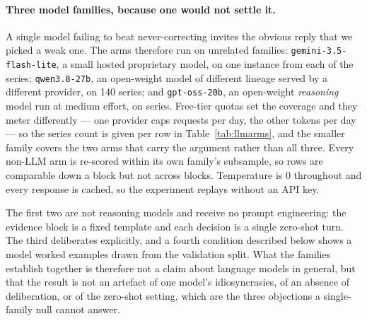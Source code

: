 \paragraph{Three model families, because one would not settle it.}
A single model failing to beat never-correcting invites the obvious reply that we picked
a weak one. The arms therefore run on unrelated families: \texttt{gemini-3.5-flash-lite},
a small hosted proprietary model, on one instance from each of the \nseries{} series;
\texttt{qwen3.8-27b}, an open-weight model of different lineage served by a different
provider, on 140 series; and \texttt{gpt-oss-20b}, an open-weight \emph{reasoning} model
run at medium effort, on \reasonSeries{} series. Free-tier quotas set the coverage and they meter differently ---
one provider caps requests per day, the other tokens per day --- so the series count is
given per row in Table~\ref{tab:llmarms}, and the smaller family covers the two arms that
carry the argument rather than all three. Every non-LLM arm is re-scored within its own
family's subsample, so rows are comparable down a block but not across blocks.
Temperature is 0 throughout and every response is cached, so the experiment replays
without an API key.

The first two are not reasoning models and receive no prompt engineering: the evidence
block is a fixed template and each decision is a single zero-shot turn. The third
deliberates explicitly, and a fourth condition described below shows a model worked
examples drawn from the validation split. What the families establish together is
therefore not a claim about language models in general, but that the result is not an
artefact of one model's idiosyncrasies, of an absence of deliberation, or of the
zero-shot setting, which are the three objections a single-family null cannot answer.

\begin{table}[htbp]
\centering
\caption{LLM correction arms against the same counterfactual outcomes, for two model
families. Non-LLM arms are re-scored within each family's own subsample, so rows are
comparable within a family block but not across blocks; the covered series count is given
per row. Effects are series-level differences from never correcting with 95\% bootstrap
intervals; $\dagger$ marks an interval excluding zero. Negative favours the policy.
``LLM calls'' is the live provider call count, since a correction stage that does not
help is still not free.}
\label{tab:llmarms}
\small
\fittable{}
\end{table}

